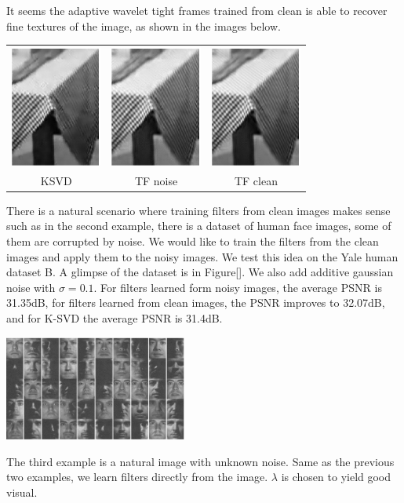 \documentclass[a4paper]{article}
\begin{document}
It seems the adaptive wavelet tight frames trained from clean is able to recover fine textures of the image, as shown in the images below.
\begin{center}
\begin{tabular}{c c c}
\includegraphics[width=3cm]{./figures/4_7.eps} & \includegraphics[width=3cm]{./figures/4_8.eps} &\includegraphics[width=3cm]{./figures/4_6.eps}\\
KSVD & TF noise & TF clean \\
\end{tabular}
\end{center}
There is a natural scenario where training filters from clean images makes sense such as in the second example, there is a dataset of human face images, some of them are corrupted by noise. We would like to train the filters from the clean images and apply them to the noisy images. We test this idea on the Yale human dataset B. A glimpse of the dataset is in Figure[]. We also add additive gaussian noise with $\sigma=0.1$. For filters learned form noisy images, the average PSNR is 31.35dB, for filters learned from clean images, the PSNR improves to 32.07dB, and for K-SVD the average PSNR is 31.4dB.
\begin{center}
\includegraphics[width=6cm]{./figures/3_2.eps}
\end{center}
The third example is a natural image with unknown noise. Same as the previous two examples, we learn filters directly from the image. $\lambda$ is chosen to yield good visual. 
\end{document}
